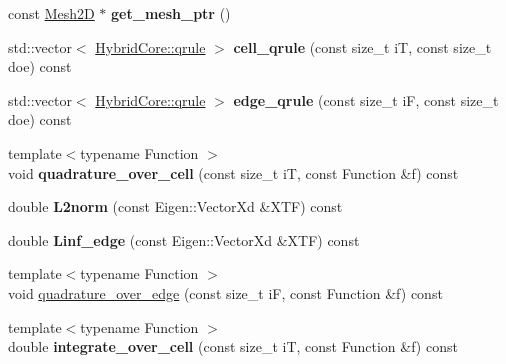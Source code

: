\begin{DoxyCompactItemize}
\mbox{\label{classMeshFramework2D_1_1HybridCore_adf1de3032113f03478e4a0b4aef0591b}} 
const \hyperlink{classMeshFramework2D_1_1Mesh2D}{Mesh2D} $\ast$ {\bfseries get\+\_\+mesh\+\_\+ptr} ()
\item 
\mbox{\label{classMeshFramework2D_1_1HybridCore_a9ecd6ca61d4f9e3f3e3af81d8de394d0}} 
std\+::vector$<$ \hyperlink{structMeshFramework2D_1_1HybridCore_1_1qrule}{Hybrid\+Core\+::qrule} $>$ {\bfseries cell\+\_\+qrule} (const size\+\_\+t iT, const size\+\_\+t doe) const
\item 
\mbox{\label{classMeshFramework2D_1_1HybridCore_a960fd81b6dd36ec913a71fd6531cb0db}} 
std\+::vector$<$ \hyperlink{structMeshFramework2D_1_1HybridCore_1_1qrule}{Hybrid\+Core\+::qrule} $>$ {\bfseries edge\+\_\+qrule} (const size\+\_\+t iF, const size\+\_\+t doe) const
\item 
\mbox{\label{classMeshFramework2D_1_1HybridCore_a3959f5d5a9fd98c719b0ef4595bbbca5}} 
{\footnotesize template$<$typename Function $>$ }\\void {\bfseries quadrature\+\_\+over\+\_\+cell} (const size\+\_\+t iT, const Function \&f) const
\item 
\mbox{\label{classMeshFramework2D_1_1HybridCore_a8301bed2cb288663bdf0eaea6add5def}} 
double {\bfseries L2norm} (const Eigen\+::\+Vector\+Xd \&X\+TF) const
\item 
\mbox{\label{classMeshFramework2D_1_1HybridCore_a4ad10216bd7a96947c648e9c92c8e11b}} 
double {\bfseries Linf\+\_\+edge} (const Eigen\+::\+Vector\+Xd \&X\+TF) const
\item 
{\footnotesize template$<$typename Function $>$ }\\void \hyperlink{classMeshFramework2D_1_1HybridCore_a7d23f6ca5a8fc8139f4b6670eabf6f49}{quadrature\+\_\+over\+\_\+edge} (const size\+\_\+t iF, const Function \&f) const
\item 
\mbox{\label{classMeshFramework2D_1_1HybridCore_aed22ee426da685cf42663278e6d0b2a3}} 
{\footnotesize template$<$typename Function $>$ }\\double {\bfseries integrate\+\_\+over\+\_\+cell} (const size\+\_\+t iT, const Function \&f) const

\end{DoxyCompactItemize}
